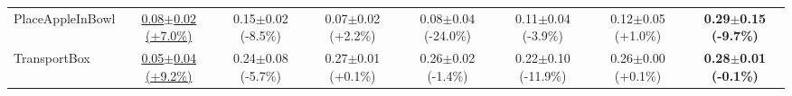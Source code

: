 \begin{table}[htbp]
\begin{adjustbox}{max width=\textwidth}
\begin{tabular}{l*{7}{c}}
PlaceAppleInBowl & \underline{0.08$\pm$0.02 \scriptsize{(+7.0\%)}} & 0.15$\pm$0.02 \scriptsize{(-8.5\%)} & 0.07$\pm$0.02 \scriptsize{(+2.2\%)} & 0.08$\pm$0.04 \scriptsize{(-24.0\%)} & 0.11$\pm$0.04 \scriptsize{(-3.9\%)} & 0.12$\pm$0.05 \scriptsize{(+1.0\%)} & \textbf{0.29$\pm$0.15 \scriptsize{(-9.7\%)}} \\
TransportBox & \underline{0.05$\pm$0.04 \scriptsize{(+9.2\%)}} & 0.24$\pm$0.08 \scriptsize{(-5.7\%)} & 0.27$\pm$0.01 \scriptsize{(+0.1\%)} & 0.26$\pm$0.02 \scriptsize{(-1.4\%)} & 0.22$\pm$0.10 \scriptsize{(-11.9\%)} & 0.26$\pm$0.00 \scriptsize{(+0.1\%)} & \textbf{0.28$\pm$0.01 \scriptsize{(-0.1\%)}} \\
\bottomrule
\end{tabular}
\end{adjustbox}
\end{table}

